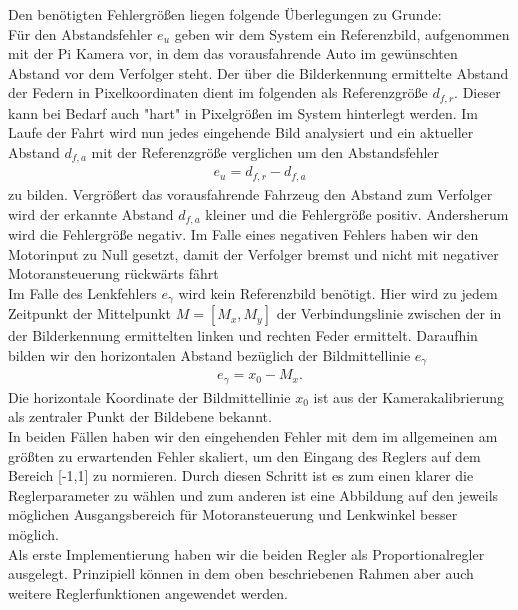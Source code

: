 \documentclass[10pt]{article}
\begin{document}
Den benötigten Fehlergrößen liegen folgende Überlegungen zu Grunde:\\
Für den Abstandsfehler $e_u$ geben wir dem System ein Referenzbild, aufgenommen mit der Pi Kamera vor, in dem das vorausfahrende Auto im gewünschten Abstand vor dem Verfolger steht. Der über die Bilderkennung ermittelte Abstand der Federn in Pixelkoordinaten dient im folgenden als Referenzgröße $d_{f,r}$. Dieser kann bei Bedarf auch "hart" in Pixelgrößen im System hinterlegt werden. Im Laufe der Fahrt wird nun jedes eingehende Bild analysiert und ein aktueller Abstand $d_{f,a}$ mit der Referenzgröße verglichen um den Abstandsfehler
\begin{eqnarray}
e_u = d_{f,r} -d_{f,a}
\end{eqnarray}
zu bilden. Vergrößert das vorausfahrende Fahrzeug den Abstand zum Verfolger wird der erkannte Abstand $ d_{f,a} $ kleiner und die Fehlergröße positiv. Andersherum wird die Fehlergröße negativ. Im Falle eines negativen Fehlers haben wir den Motorinput zu Null gesetzt, damit der Verfolger bremst und nicht mit negativer Motoransteuerung rückwärts fährt\\
Im Falle des Lenkfehlers $e_{\gamma}$ wird kein Referenzbild benötigt. Hier wird zu jedem Zeitpunkt der Mittelpunkt $M=[M_x, M_y]$ der Verbindungslinie zwischen der in der Bilderkennung ermittelten linken und rechten Feder ermittelt. Daraufhin bilden wir den horizontalen Abstand bezüglich der Bildmittellinie $e_{\gamma}$
\begin{eqnarray}
e_{\gamma} = x_0 - M_x.
\end{eqnarray}
Die horizontale Koordinate der Bildmittellinie $x_0$ ist aus der Kamerakalibrierung als zentraler Punkt der Bildebene bekannt.\\
In beiden Fällen haben wir den eingehenden Fehler mit dem im allgemeinen am größten zu erwartenden Fehler skaliert, um den Eingang des Reglers auf dem Bereich [-1,1] zu normieren. Durch diesen Schritt ist es zum einen klarer die Reglerparameter zu wählen und zum anderen ist eine Abbildung auf den jeweils möglichen Ausgangsbereich für Motoransteuerung und Lenkwinkel besser möglich.\\
Als erste Implementierung haben wir die beiden Regler als Proportionalregler ausgelegt. Prinzipiell können in dem oben beschriebenen Rahmen aber auch weitere Reglerfunktionen angewendet werden.\\
\end{document}
